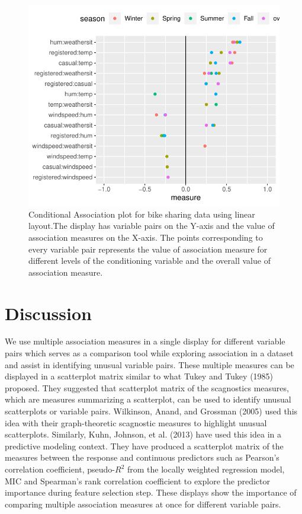 \begin{figure}

\includegraphics{rjpaperCHMar22_files/figure-latex/linear-cond-assoc-1} \hfill{}

\caption{Conditional Association plot for bike sharing data using linear layout.The display has variable pairs on the Y-axis and the value of association measures on the X-axis. The points corresponding to every variable pair represents the value of association measure for different levels of the conditioning variable and the overall value of association measure.}\label{fig:linear-cond-assoc}
\end{figure}

\hypertarget{discussion}{%
\section{Discussion}\label{discussion}}

We use multiple association measures in a single display for different variable pairs which serves as a comparison tool while exploring association in a dataset and assist in identifying unusual variable pairs. These multiple measures can be displayed in a scatterplot matrix similar to what Tukey and Tukey (1985) proposed. They suggested that scatterplot matrix of the scagnostics measures, which are measures summarizing a scatterplot, can be used to identify unusual scatterplots or variable pairs. Wilkinson, Anand, and Grossman (2005) used this idea with their graph-theoretic scagnostic measures to highlight unusual scatterplots. Similarly, Kuhn, Johnson, et al. (2013) have used this idea in a predictive modeling context. They have produced a scatterplot matrix of the measures between the response and continuous predictors such as Pearson's correlation coefficient, pseudo-\(R^2\) from the locally weighted regression model, MIC and Spearman's rank correlation coefficient to explore the predictor importance during feature selection step. These displays show the importance of comparing multiple association measures at once for different variable pairs.

